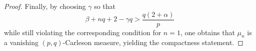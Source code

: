 \documentclass[10pt,a4paper]{amsart}
\begin{document}
\begin{proof}
Finally, by choosing $\gamma$ so that
\begin{equation*}
\beta+nq+2-\gamma q > \frac{q(2+\alpha)}{p}
\end{equation*}
while still violating the corresponding condition for $n=1$, one obtains that $\mu_n$
is a vanishing $(p,q)$-Carleson measure, yielding the compactness statement.
\end{proof}
\end{document}
